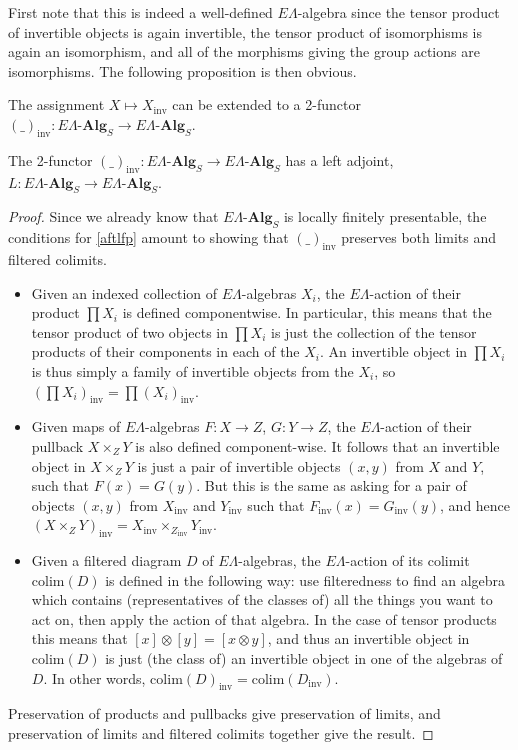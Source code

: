 \documentclass{amsbook} %
\newcommand{\mb}{\mathbf}
\numberwithin{section}{chapter}
\begin{document}
First note that this is indeed a well-defined $E\Lambda$-algebra since the tensor product of invertible objects is again invertible, the tensor product of isomorphisms is again an isomorphism, and all of the morphisms giving the group actions are isomorphisms. The following proposition is then obvious.


\begin{prop} \label{invprop} The assignment $X \mapsto X_{\mathrm{inv}}$ can be extended to a 2-functor $(\_)_{\mathrm{inv}}: E\Lambda\mbox{-}\mb{Alg}_S \to E\Lambda\mbox{-}\mb{Alg}_S$.
\end{prop}


\begin{prop} \label{invadj} The 2-functor $(\_)_{\mathrm{inv}}: E\Lambda\mbox{-}\mb{Alg}_S \to E\Lambda\mbox{-}\mb{Alg}_S$ has a left adjoint, $L: E\Lambda\mbox{-}\mb{Alg}_S \to E\Lambda\mbox{-}\mb{Alg}_S$.
\end{prop}
\begin{proof} Since we already know that $E\Lambda\mbox{-}\mb{Alg}_S$ is locally finitely presentable, the conditions for \cref{aftlfp} amount to showing that $(\_)_{\mathrm{inv}}$ preserves both limits and filtered colimits.
\begin{itemize}
\item Given an indexed collection of $E\Lambda$-algebras $X_i$, the $E\Lambda$-action of their product $\prod X_i$ is defined componentwise. In particular, this means that the tensor product of two objects in $\prod X_i$ is just the collection of the tensor products of their components in each of the $X_i$. An invertible object in $\prod X_i$ is thus simply a family of invertible objects from the $X_i$, so $(\prod X_i)_{\mathrm{inv}} = \prod (X_i)_{\mathrm{inv}}$.
\item Given maps of $E\Lambda$-algebras $F: X \to Z$, $G : Y \to Z$, the $E\Lambda$-action of their pullback $X \times_Z Y$ is also defined component-wise. It follows that an invertible object in $X \times_Z Y$ is just a pair of invertible objects $(x, y)$ from $X$ and $Y$, such that $F(x) = G(y)$. But this is the same as asking for a pair of objects $(x, y)$ from $X_{\mathrm{inv}}$ and $Y_{\mathrm{inv}}$ such that $F_{\mathrm{inv}}(x) = G_{\mathrm{inv}}(y)$, and hence $(X \times_Z Y)_{\mathrm{inv}} = X_{\mathrm{inv}} \times_{Z_{\mathrm{inv}}} Y_{\mathrm{inv}}$.
\item Given a filtered diagram $D$ of $E\Lambda$-algebras, the $E\Lambda$-action of its colimit $\mathrm{colim}(D)$ is defined in the following way: use filteredness to find an algebra which contains (representatives of the classes of) all the things you want to act on, then apply the action of that algebra. In the case of tensor products this means that $[x]\otimes[y] = [x \otimes y]$, and thus an invertible object in $\mathrm{colim}(D)$ is just (the class of) an invertible object in one of the algebras of $D$. In other words, $\mathrm{colim}(D)_{\mathrm{inv}} = \mathrm{colim}(D_{\mathrm{inv}})$.
\end{itemize}
Preservation of products and pullbacks give preservation of limits, and preservation of limits and filtered colimits together give the result.
\end{proof}
\end{document}
